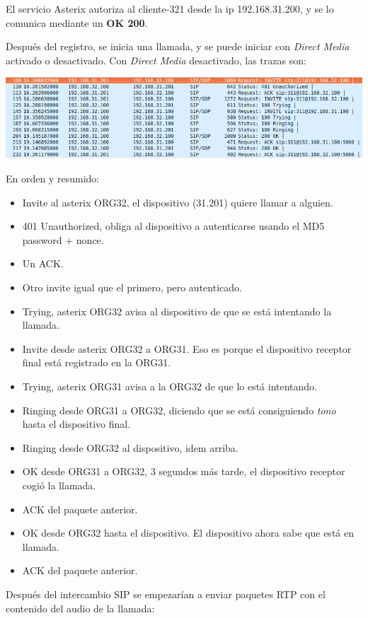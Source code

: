 \documentclass[]{article}
\begin{document}
El servicio Asterix autoriza al cliente-321 desde la ip 192.168.31.200, y se lo comunica mediante un \textbf{OK 200}.

Después del registro, se inicia una llamada, y se puede iniciar con \textit{Direct Media} activado o desactivado. 
Con \textit{Direct Media} desactivado, las trazas son:

\begin{center}
\includegraphics[width=1\linewidth]{images/voip5}
\end{center}

En orden y resumido:

\begin{itemize}
	\item Invite al asterix ORG32, el dispositivo (31.201) quiere llamar a alguien.
	\item 401 Unauthorized, obliga al dispositivo a autenticarse usando el MD5 password + nonce.
	\item Un ACK.
	\item Otro invite igual que el primero, pero autenticado.
	\item Trying, asterix ORG32 avisa al dispositivo de que se está intentando la llamada.
	\item Invite desde asterix ORG32 a ORG31. Eso es porque el dispositivo receptor final está registrado en la ORG31.
	\item Trying, asterix ORG31 avisa a la ORG32 de que lo está intentando.
	\item Ringing desde ORG31 a ORG32, diciendo que se está consiguiendo \textit{tono} hasta el dispositivo final.
	\item Ringing desde ORG32 al dispositivo, idem arriba.
	\item OK desde ORG31 a ORG32, 3 segundos más tarde, el dispositivo receptor cogió la llamada.
	\item ACK del paquete anterior.
	\item OK desde ORG32 hasta el dispositivo. El dispositivo ahora sabe que está en llamada.
	\item ACK del paquete anterior.
\end{itemize}

Después del intercambio SIP se empezarían a enviar paquetes RTP con el contenido del audio de la llamada:
\end{document}
